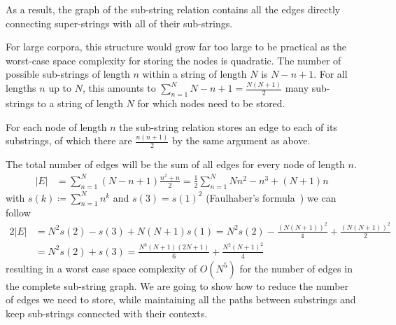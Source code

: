 

\noindent
As a result, the graph of the sub-string relation contains all the edges directly connecting super-strings with all of their sub-strings.

\noindent
For large corpora, this structure would grow far too large to be practical as the worst-case space complexity for storing the nodes is quadratic. The number of possible sub-strings of length $n$ within a string of length $N$ is $N - n + 1$. For all lengths $n$ up to $N$, this amounts to $\sum_{n=1}^{N}{N-n+1} = \frac{N(N + 1)}{2}$ many sub-strings to a string of length $N$ for which nodes need to be stored.

\noindent
For each node of length $n$ the sub-string relation stores an edge to each of its substrings, of which there are $\frac{n(n + 1)}{2}$ by the same argument as above.

\noindent
The total number of edges will be the sum of all edges for every node of length $n$.
\begin{align*}
|E| &= \sum_{n=1}^{N}{(N - n + 1)\frac{n^2 + n}{2}} = \frac{1}{2}\sum_{n=1}^{N}{Nn^2 - n^3 + (N + 1)n}
\end{align*}
with $s(k) \coloneqq \sum_{n=1}^{N}{n^k}$ and $s(3) = {s(1)}^2$ (Faulhaber's formula~\cite{orosi2018simple}) we can follow
\begin{align*}
2|E| &= N^2s(2) - s(3) + N(N + 1)s(1) =
N^2s(2) - \frac{{\left(N(N+1)\right)}^2}{4} + \frac{\left(N(N+1)\right)^2}{2}\\
&= N^2s(2) + s(3) = \frac{N^3(N+1)(2N+1)}{6} + \frac{N^2{(N+1)}^2}{4}
\end{align*}
resulting in a worst case space complexity of $O(N^5)$ for the number of edges in the complete sub-string graph. We are going to show how to reduce the number of edges we need to store, while maintaining all the paths between substrings and keep sub-strings connected with their contexts.

